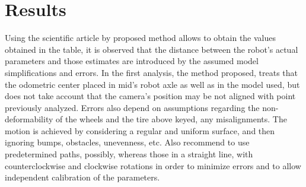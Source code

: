 \section{Results}
Using the scientific article by proposed method allows to obtain the values obtained in the table, it is observed that the distance between the robot's actual parameters and those estimates are introduced by the assumed model simplifications and errors.
In the first analysis, the method proposed, treats that the odometric center placed in mid's robot axle as well as in the model used, but does not take account that the camera's position may be not aligned with point previously analyzed.
Errors also depend on assumptions regarding the non-deformability of the wheels and the tire above keyed, any misalignments. The motion is achieved by considering a regular and uniform surface, and then ignoring bumps, obstacles, unevenness, etc.
Also recommend to use predetermined paths, possibly, whereas those in a straight line, with counterclockwise and clockwise rotations in order to minimize errors and to allow independent calibration of the parameters.